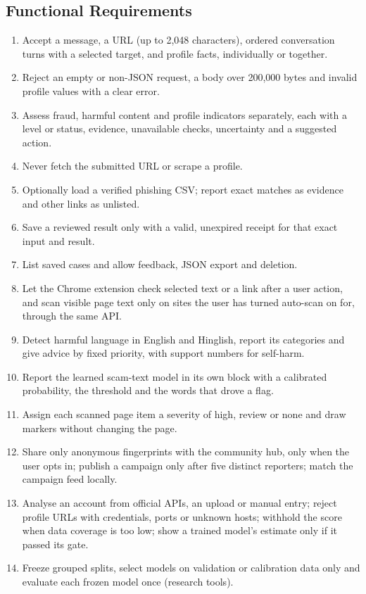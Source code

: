 \subsection{Functional Requirements}
\begin{enumerate}[label=FR\arabic*:, leftmargin=1.4cm]
\item Accept a message, a URL (up to 2,048 characters), ordered conversation turns with a selected target, and profile facts, individually or together.
\item Reject an empty or non-JSON request, a body over 200,000 bytes and invalid profile values with a clear error.
\item Assess fraud, harmful content and profile indicators separately, each with a level or status, evidence, unavailable checks, uncertainty and a suggested action.
\item Never fetch the submitted URL or scrape a profile.
\item Optionally load a verified phishing CSV; report exact matches as evidence and other links as unlisted.
\item Save a reviewed result only with a valid, unexpired receipt for that exact input and result.
\item List saved cases and allow feedback, JSON export and deletion.
\item Let the Chrome extension check selected text or a link after a user action, and scan visible page text only on sites the user has turned auto-scan on for, through the same API.
\item Detect harmful language in English and Hinglish, report its categories and give advice by fixed priority, with support numbers for self-harm.
\item Report the learned scam-text model in its own block with a calibrated probability, the threshold and the words that drove a flag.
\item Assign each scanned page item a severity of high, review or none and draw markers without changing the page.
\item Share only anonymous fingerprints with the community hub, only when the user opts in; publish a campaign only after five distinct reporters; match the campaign feed locally.
\item Analyse an account from official APIs, an upload or manual entry; reject profile URLs with credentials, ports or unknown hosts; withhold the score when data coverage is too low; show a trained model's estimate only if it passed its gate.
\item Freeze grouped splits, select models on validation or calibration data only and evaluate each frozen model once (research tools).
\end{enumerate}

